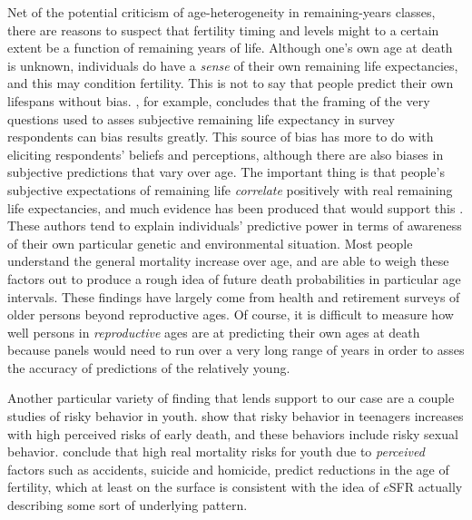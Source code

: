 Net of the potential criticism of age-heterogeneity in remaining-years classes,
there are reasons to suspect that fertility timing and levels might to a certain
extent be a function of remaining years of life. Although one's own age at death
is unknown, individuals do have a \textit{sense} of their own remaining life
expectancies, and this may condition fertility. This is not to say that people 
predict their own lifespans without bias. \citet{payne2013life}, for example,
concludes that the framing of the very questions used to asses subjective
remaining life expectancy in survey respondents can bias results greatly. This
source of bias has more to do with eliciting respondents' beliefs and
perceptions, although there are also biases in subjective predictions that vary
over age. The important thing is that people's subjective expectations of
remaining life \textit{correlate} positively with real remaining life
expectancies, and much evidence has been produced that would support
this \citep{hurd1995evaluation, mirowsky1999subjective, hurd2002predictive,
perozek2008using, delavande2011differential, post2012longevity}. These authors
tend to explain individuals' predictive power in terms of awareness of
their own particular genetic and environmental situation. Most people
understand the general mortality increase over age, and are able to
weigh these factors out to produce a rough idea of future death 
probabilities in particular age intervals. These findings have largely come from
health and retirement surveys of older persons beyond reproductive ages. Of
course, it is difficult to measure how well persons in \textit{reproductive}
ages are at predicting their own ages at death because panels would need to
run over a very long range of years in order to asses the accuracy of
predictions of the relatively young. 

Another particular variety of finding that lends support to our case are
a couple studies of risky behavior in youth. \citet{borowsky2009health} show
that risky behavior in teenagers increases with high perceived risks of early death, and these
behaviors include risky sexual behavior. \citet{wilson1997life} conclude that
high real mortality risks for youth due to \textit{perceived} factors such as 
accidents, suicide and homicide, predict reductions in the age of fertility, which at
least on the surface is consistent with the idea of $e$SFR actually describing 
some sort of underlying pattern. 

